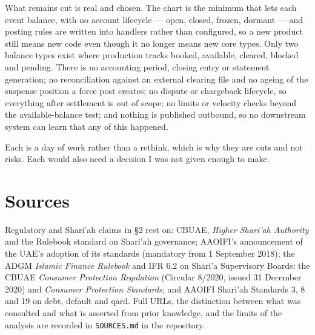 \documentclass[10pt,a4paper]{article}
\begin{document}
What remains cut is real and chosen. The chart is the minimum that lets each
event balance, with no account lifecycle --- open, closed, frozen, dormant ---
and posting rules are written into handlers rather than configured, so a new
product still means new code even though it no longer means new core types.
Only two balance types exist where production tracks booked, available,
cleared, blocked and pending. There is no accounting period, closing entry or
statement generation; no reconciliation against an external clearing file and
no ageing of the suspense position a force post creates; no dispute or
chargeback lifecycle, so everything after settlement is out of scope; no limits
or velocity checks beyond the available-balance test; and nothing is published
outbound, so no downstream system can learn that any of this happened.

Each is a day of work rather than a rethink, which is why they are cuts and not
risks. Each would also need a decision I was not given enough to make.


\section*{Sources}
\small
Regulatory and Shari'ah claims in \S2 rest on: CBUAE, \textit{Higher Shari'ah
Authority} and the Rulebook standard on Shari'ah governance; AAOIFI's
announcement of the UAE's adoption of its standards (mandatory from 1 September
2018); the ADGM \textit{Islamic Finance Rulebook} and IFR 6.2 on Shari'a
Supervisory Boards; the CBUAE \textit{Consumer Protection Regulation}
(Circular 8/2020, issued 31 December 2020) and \textit{Consumer Protection
Standards}; and AAOIFI Shari'ah Standards 3, 8 and 19 on debt, default and
qard. Full URLs, the distinction between what was consulted and what is
asserted from prior knowledge, and the limits of the analysis are recorded in
\texttt{SOURCES.md} in the repository.
\end{document}
